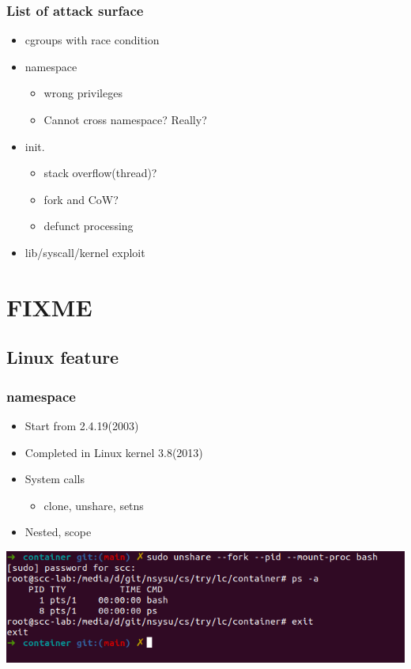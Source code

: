 \documentclass{beamer}
\begin{document}
\begin{frame}
    \frametitle{List of attack surface}
    \begin{itemize}
        \item cgroups with race condition
        \item namespace
              \begin{itemize}
                  \item wrong privileges
                  \item Cannot cross namespace? Really?
              \end{itemize}
        \item init.
              \begin{itemize}
                  \item stack overflow(thread)?
                  \item fork and CoW?
                  \item defunct processing
              \end{itemize}
        \item lib/syscall/kernel exploit
    \end{itemize}
\end{frame}


\section{FIXME}
\subsection{Linux feature}
\begin{frame}
    \frametitle{namespace}
    \begin{itemize}
        \item Start from 2.4.19(2003)
        \item Completed in Linux kernel 3.8(2013)
        \item System calls
              \begin{itemize}
                  \item clone, unshare, setns
              \end{itemize}
        \item Nested, scope
    \end{itemize}
    \includegraphics[width=\textwidth]{unshare_cmd.png}
\end{frame}
\end{document}
